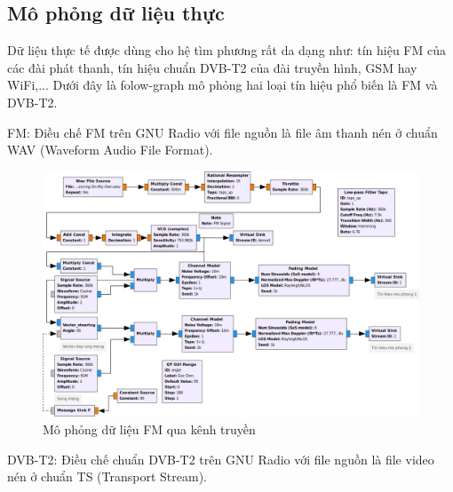 {\subsection{Mô phỏng dữ liệu thực}


Dữ liệu thực tế được dùng cho hệ tìm phương rất da dạng như: tín hiệu FM của các đài phát thanh, tín hiệu chuẩn DVB-T2 của đài truyền hình, GSM hay WiFi,... Dưới đây là folow-graph mô phỏng hai loại tín hiệu phổ biến là FM và DVB-T2.%

FM: Điều chế FM trên GNU Radio với file nguồn là file âm thanh nén ở chuẩn WAV (Waveform Audio File Format).

\begin{figure} [!h]
	\centering
	\includegraphics[width=1\linewidth]{figures/fmmod.png}
	\caption{Mô phỏng dữ liệu FM qua kênh truyền}
	\label{fig:fmmod}
\end{figure}

DVB-T2: Điều chế chuẩn DVB-T2 trên GNU Radio với file nguồn là file video nén ở chuẩn TS (Transport Stream).

}
